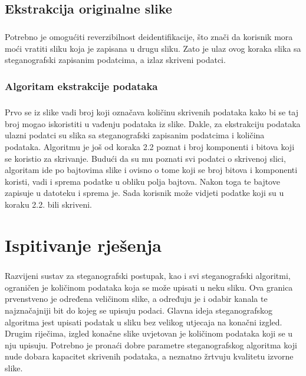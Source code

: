 \documentclass[times, utf8, seminar, numeric]{fer}
\begin{document}
\section{Ekstrakcija originalne slike}
\paragraph{}
Potrebno je omogućiti reverzibilnost deidentifikacije, što znači da korisnik mora moći vratiti sliku koja je zapisana u drugu sliku. Zato je ulaz ovog koraka slika sa steganografski zapisanim podatcima, a izlaz skriveni podatci.
\subsection{Algoritam ekstrakcije podataka}
\paragraph{}
Prvo se iz slike vadi broj koji označava količinu skrivenih podataka kako bi se taj broj mogao iskoristiti u vađenju podataka iz slike. Dakle, za ekstrakciju podataka ulazni podatci su slika sa steganografski zapisanim podatcima i količina podataka. Algoritmu je još od koraka 2.2 poznat i broj komponenti i bitova koji se koristio za skrivanje. Budući da su mu poznati svi podatci o skrivenoj slici, algoritam ide po bajtovima slike i ovisno o tome koji se broj bitova i komponenti koristi, vadi i sprema podatke u obliku polja bajtova. Nakon toga te bajtove zapisuje u datoteku i sprema je. Sada korisnik može vidjeti podatke koji su u koraku 2.2. bili skriveni.
\chapter{Ispitivanje rješenja}
\paragraph{}
Razvijeni sustav za steganografski postupak, kao i svi steganografski algoritmi, ograničen je količinom podataka koja se može upisati u neku sliku. Ova granica prvenstveno je određena veličinom slike, a određuju je i odabir kanala te najznačajniji bit do kojeg se upisuju podaci. Glavna ideja steganografskog algoritma jest upisati podatak u sliku bez velikog utjecaja na konačni izgled. Drugim riječima, izgled konačne slike uvjetovan je količinom podataka koji se u nju upisuju. Potrebno je pronaći dobre parametre steganografskog algoritma koji nude dobara kapacitet skrivenih podataka, a neznatno žrtvuju kvalitetu izvorne slike.
\end{document}
